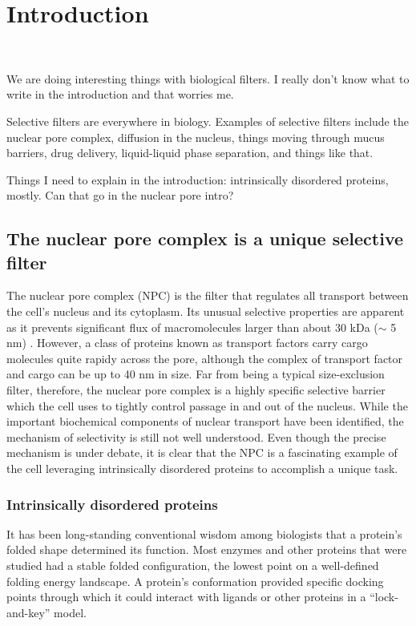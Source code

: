 \chapter{Introduction}~\label{ch01_introduction}

We are doing interesting things with biological filters.  I really don't know what to write in the introduction and that worries me.

Selective filters are everywhere in biology.  Examples of selective filters include the nuclear pore complex, diffusion in the nucleus, things moving through mucus barriers, drug delivery, liquid-liquid phase separation, and things like that.

Things I need to explain in the introduction: intrinsically disordered proteins, mostly.  Can that go in the nuclear pore intro?

\section{The nuclear pore complex is a unique selective filter}

The nuclear pore complex (NPC) is the filter that regulates all transport between the cell's nucleus and its cytoplasm.  Its unusual selective properties are apparent as it prevents significant flux of macromolecules larger than about 30 kDa ($\sim$ 5 nm) \cite{timney16}.  However, a class of proteins known as transport factors carry cargo molecules quite rapidy across the pore, although the complex of transport factor and cargo can be up to 40 nm in size.  Far from being a typical size-exclusion filter, therefore, the nuclear pore complex is a highly specific selective barrier which the cell uses to tightly control passage in and out of the nucleus. While the important biochemical components of nuclear transport have been identified, the mechanism of selectivity is still not well understood.  Even though the precise mechanism is under debate, it is clear that the NPC is a fascinating example of the cell leveraging intrinsically disordered proteins to accomplish a unique task.

\subsection{Intrinsically disordered proteins}

It has been long-standing conventional wisdom among biologists that a protein's folded shape determined its function.  Most enzymes and other proteins that were studied had a stable folded configuration, the lowest point on a well-defined folding energy landscape.  A protein's conformation provided specific docking points through which it could interact with ligands or other proteins in a ``lock-and-key'' model.

